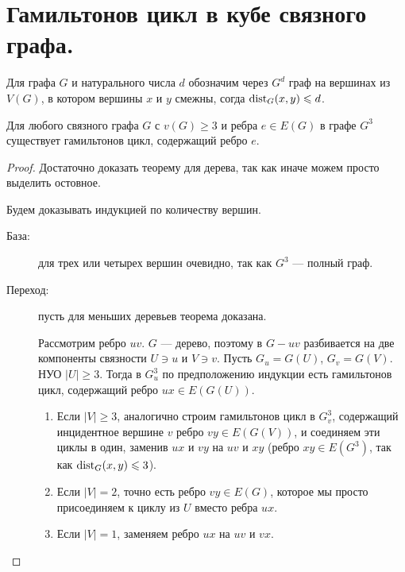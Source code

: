 \section{Гамильтонов цикл в кубе связного графа.}
\begin{definition}
    Для графа $G$ и натурального числа  $d$ обозначим через $G^{d}$ граф на вершинах из  $V(G)$, в котором вершины $x$ и $y$ смежны, согда $\operatorname{dist}_G(x, y) \leqslant d$.
\end{definition}
\begin{theorem}
	Для любого связного графа $G$ с $v(G) \ge 3$ и ребра $e \in E(G)$ в графе $G^3$ существует гамильтонов цикл, содержащий ребро $e$.
\end{theorem}
\begin{proof}
    Достаточно доказать теорему для дерева, так как иначе можем просто выделить остовное.

	Будем доказывать индукцией по количеству вершин. 

	\begin{description}
		\item[База:] для трех или четырех вершин очевидно, так как $G^3$ --- полный граф.
		\item[Переход:] пусть для меньших деревьев теорема доказана. 

			Рассмотрим ребро $uv$. $G$ --- дерево, поэтому в $G-uv$ разбивается на две компоненты связности $U \ni u$ и $V \ni v$. Пусть $G_u = G(U)$, $G_v = G(V)$. НУО  $\lvert U \rvert \ge 3$. Тогда в $G_u^3$ по предположению индукции есть гамильтонов цикл, содержащий ребро $ux \in E(G(U))$.

			\begin{enumerate}[label=(\alph*)]
				\item Если $\lvert V \rvert \ge 3$, аналогично строим гамильтонов цикл в $G_v^3$, содержащий инцидентное вершине $v$ ребро $vy \in E(G(V))$, и соединяем эти циклы в один, заменив $ux$ и $vy$ на $uv$ и $xy$ (ребро $xy \in E(G^3)$, так как $\operatorname{dist}_G(x, y) \leqslant 3$). 
				\item Если $\lvert V \rvert =2$, точно есть ребро $vy \in E(G)$, которое мы просто присоединяем к циклу из $U$ вместо ребра $ux$.
				\item Если  $\lvert V \rvert = 1$, заменяем ребро $ux$ на $uv$ и $vx$.
			\end{enumerate}
	\begin{figure}[ht]
		\centering
		\begin{subfigure}{0.32\linewidth}
			\centering
			\caption{}
			\label{fig:capoor-thm}
		\end{subfigure}
		\begin{subfigure}{0.32\linewidth}
			\centering
			\caption{}
			\label{fig:capoor-thm-b}
		\end{subfigure}
		\begin{subfigure}{0.32\linewidth}
			\centering
			\caption{}
			\label{fig:capoor-thm-c}
		\end{subfigure}
	\end{figure}
	\end{description}
\end{proof}
